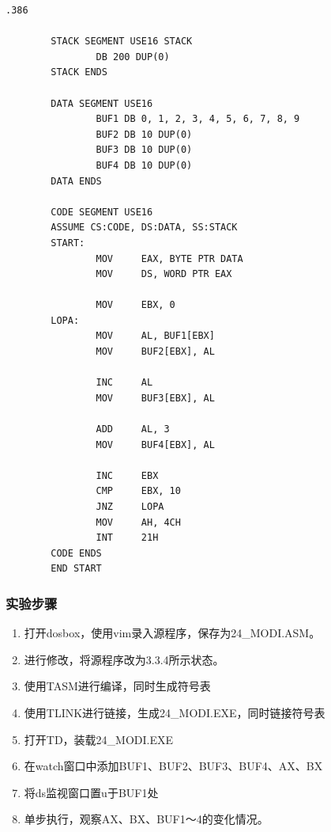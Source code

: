\documentclass{article}
\newenvironment{codeFont}{\codeF}{\par}
\begin{document}
	\begin{codeFont}
	\begin{lstlisting}[gobble=8]
		.386

		STACK SEGMENT USE16 STACK
				DB 200 DUP(0)
		STACK ENDS

		DATA SEGMENT USE16
				BUF1 DB 0, 1, 2, 3, 4, 5, 6, 7, 8, 9
				BUF2 DB 10 DUP(0)
				BUF3 DB 10 DUP(0)
				BUF4 DB 10 DUP(0)
		DATA ENDS

		CODE SEGMENT USE16
		ASSUME CS:CODE, DS:DATA, SS:STACK
		START:
				MOV		EAX, BYTE PTR DATA
				MOV		DS, WORD PTR EAX

				MOV		EBX, 0
		LOPA:
				MOV		AL, BUF1[EBX]
				MOV		BUF2[EBX], AL

				INC		AL
				MOV		BUF3[EBX], AL

				ADD		AL, 3
				MOV		BUF4[EBX], AL

				INC		EBX
				CMP		EBX, 10
				JNZ		LOPA
				MOV		AH, 4CH
				INT		21H
		CODE ENDS
		END START
	\end{lstlisting}
	\end{codeFont}

	\subsubsection{实验步骤}
	\begin{enumerate}
		\item 打开dosbox，使用vim录入源程序，保存为24\_MODI.ASM。
		\item 进行修改，将源程序改为3.3.4所示状态。
		\item 使用TASM进行编译，同时生成符号表
		\item 使用TLINK进行链接，生成24\_MODI.EXE，同时链接符号表
		\item 打开TD，装载24\_MODI.EXE
		\item 在watch窗口中添加BUF1、BUF2、BUF3、BUF4、AX、BX
		\item 将ds监视窗口置u于BUF1处
		\item 单步执行，观察AX、BX、BUF1～4的变化情况。
	\end{enumerate}
\end{document}
